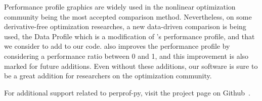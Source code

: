 Performance profile graphics are widely used in the nonlinear optimization
community being the most accepted comparison method.
Nevertheless, on some derivative-free optimization researches,  a new data-driven comparison is being used,
the Data Profile \cite{bib:more2009benchmarking} which is a modification of 
\citeauthor{Dolan:2002du}'s performance profile, and that we consider to add to our code. 
\textcite{bib:mahajan2012solving} also improves the performance profile by considering
a performance ratio between 0 and 1, and this improvement is also marked for
future additions. Even without these additions, our software is sure to be a great addition for
researchers on the optimization community.

For additional support related to perprof-py, visit the project page on Github~\cite{url:perprof-py}. 